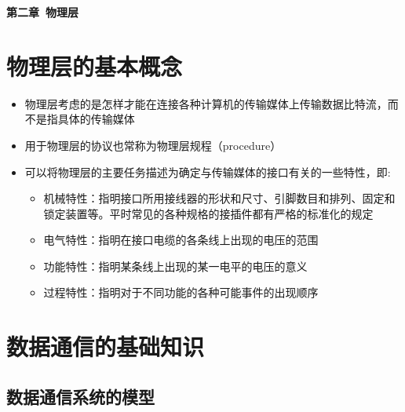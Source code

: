\documentclass[cs4size,a4paper,10pt]{ctexart}
\begin{document}
	\begin{center}
		{\huge\textbf{第二章\ 物理层}}
	\end{center}
	\tableofcontents
	\clearpage

	\setcounter{page}{1}
	\setlength{\parskip}{0.65em}
	
	\section{物理层的基本概念}

	\begin{itemize}
		\item 物理层考虑的是怎样才能在连接各种计算机的传输媒体上传输数据比特流，而不是指具体的传输媒体
		\item 用于物理层的协议也常称为物理层规程（procedure）
		\item 可以将物理层的主要任务描述为确定与传输媒体的接口有关的一些特性，即:
		\begin{itemize}
			\item 机械特性：指明接口所用接线器的形状和尺寸、引脚数目和排列、固定和锁定装置等。平时常见的各种规格的接插件都有严格的标准化的规定
			\item 电气特性：指明在接口电缆的各条线上出现的电压的范围
			\item 功能特性：指明某条线上出现的某一电平的电压的意义
			\item 过程特性：指明对于不同功能的各种可能事件的出现顺序
		\end{itemize}
	\end{itemize}


	\section{数据通信的基础知识}

	\subsection{数据通信系统的模型}
\end{document}
